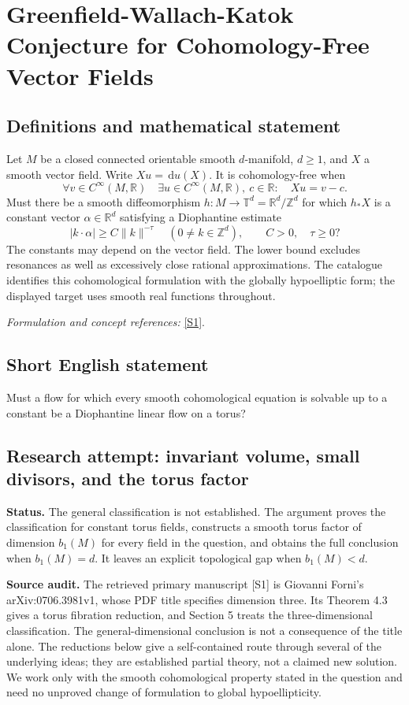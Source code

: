 \documentclass[11pt]{article}
\begin{document}
\section*{\texorpdfstring{Greenfield-Wallach-Katok Conjecture for Cohomology-Free Vector Fields}{Greenfield-Wallach-Katok Conjecture for Cohomology-Free Vector Fields}}\label{30006951}
\subsection{Definitions and mathematical statement}
Let $M$ be a closed connected orientable smooth $d$-manifold, $d\ge1$, and $X$ a smooth vector field. Write $Xu={\,\mathrm{d}} u(X)$. It is cohomology-free when
\[
 \forall v\in C^\infty(M,{\mathbb{R}})\quad
 \exists u\in C^\infty(M,{\mathbb{R}}),\ c\in{\mathbb{R}}:\quad Xu=v-c.
\]
Must there be a smooth diffeomorphism $h:M\to\mathbb T^d={\mathbb{R}}^d/{\mathbb{Z}}^d$ for which $h_*X$ is a constant vector $\alpha\in{\mathbb{R}}^d$ satisfying a Diophantine estimate
\[
 |k\cdot\alpha|\ge C\|k\|^{-\tau}
 \quad(0\ne k\in{\mathbb{Z}}^d),\qquad C>0,\quad\tau\ge0?
\]
The constants may depend on the vector field. The lower bound excludes resonances as well as excessively close rational approximations. The catalogue identifies this cohomological formulation with the globally hypoelliptic form; the displayed target uses smooth real functions throughout.
\par\smallskip\textit{Formulation and concept references:} \href{https://arxiv.org/pdf/0706.3981}{[S1]}.

\subsection{Short English statement}
Must a flow for which every smooth cohomological equation is solvable up to a constant be a Diophantine linear flow on a torus?
\subsection{Research attempt: invariant volume, small divisors, and the torus factor}
\textbf{Status.} The general classification is not established. The argument proves the classification for constant torus fields, constructs a smooth torus factor of dimension $b_1(M)$ for every field in the question, and obtains the full conclusion when $b_1(M)=d$. It leaves an explicit topological gap when $b_1(M)<d$.

\textbf{Source audit.} The retrieved primary manuscript [S1] is Giovanni Forni's arXiv:0706.3981v1, whose PDF title specifies dimension three. Its Theorem 4.3 gives a torus fibration reduction, and Section 5 treats the three-dimensional classification. The general-dimensional conclusion is not a consequence of the title alone. The reductions below give a self-contained route through several of the underlying ideas; they are established partial theory, not a claimed new solution. We work only with the smooth cohomological property stated in the question and need no unproved change of formulation to global hypoellipticity.
\end{document}
